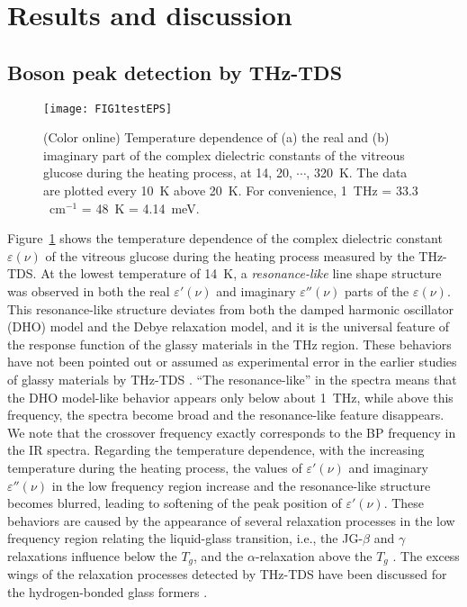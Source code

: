 \documentclass[%
 reprint,
superscriptaddress,
 amsmath,amssymb,
 aps,
prb,
]{revtex4-1}
\begin{document}
\section{Results and discussion}

\subsection{Boson peak detection by THz-TDS}

\begin{figure}[b]
\texttt{[image: FIG1testEPS]}
\caption{(Color online) Temperature dependence of (a) the real and (b) imaginary part of the complex dielectric constants of the vitreous glucose during the heating process, at 14, 20, $\cdots$, 320~K. The data are plotted every 10~K above 20~K. For convenience, 1~THz = 33.3 ~cm$^{-1}$ = 48~K = 4.14~meV.}
\label{fig1}
\end{figure}

Figure~\ref{fig1} shows the temperature dependence of the complex dielectric constant $\varepsilon(\nu)$ of the vitreous glucose during the heating process measured by the THz-TDS. At the lowest temperature of 14~K, a {\it resonance-like} line shape structure was observed in both the real $\varepsilon'(\nu)$ and imaginary $\varepsilon''(\nu)$ parts of the $\varepsilon(\nu)$. This resonance-like structure deviates from both the damped harmonic oscillator (DHO) model and the Debye relaxation model, and it is the universal feature of the response function of the glassy materials in the THz region. These behaviors have not been pointed out or assumed as experimental error in the earlier studies of glassy materials by THz-TDS \cite{Grischkowsky1990, Walther2003}.
``The resonance-like'' in the spectra  means that the DHO model-like behavior appears only below about 1~THz, while above this frequency, the spectra become broad and the resonance-like feature disappears. We note that the crossover frequency exactly corresponds to the BP frequency in the IR spectra.
Regarding the temperature dependence, with the increasing temperature during the heating process, the values of $\varepsilon'(\nu)$ and imaginary $\varepsilon''(\nu)$ in the low frequency region increase and the resonance-like structure becomes blurred, leading to softening of the peak position of $\varepsilon'(\nu)$.
These behaviors are caused by the appearance of several relaxation processes in the low frequency region relating the liquid-glass transition, i.e., the JG-$\beta$ and $\gamma$ relaxations influence below the $T_g$, and the $\alpha$-relaxation above the $T_g$ \cite{Kaminski2006}. The excess wings of the relaxation processes detected by THz-TDS have been discussed for the hydrogen-bonded glass formers \cite{Sibik2013, Sibik2014, Parrott2015}.
\end{document}
